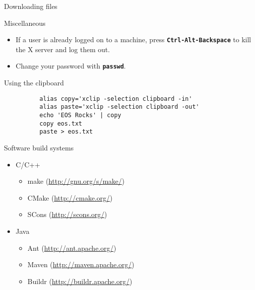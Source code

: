 \documentclass[8pt]{beamer}
\newcommand{\command}[1]{\textbf{\texttt{#1}}}
\begin{document}
\begin{frame}[fragile]{}
\begin{columns}
\begin{column}{0.49\textwidth}
\begin{block}{Downloading files}
      \end{block}
      \vfill
      \begin{block}{Miscellaneous}
        \begin{itemize}
        \item If a user is already logged on to a machine, press \command{Ctrl-Alt-Backspace} to kill the X server and log them out.
        \item Change your password with \command{passwd}.
        \end{itemize}
      \end{block}
      \vfill
      \begin{block}{Using the clipboard}
        \begin{verbatim}
          alias copy='xclip -selection clipboard -in'
          alias paste='xclip -selection clipboard -out'
          echo 'EOS Rocks' | copy
          copy eos.txt
          paste > eos.txt
        \end{verbatim}
      \end{block}
      \vfill
      \begin{block}{Software build systems}
        \begin{itemize}
        \item C/C++
          \begin{itemize}
          \item make (\url{http://gnu.org/s/make/})
          \item CMake (\url{http://cmake.org/})
          \item SCons (\url{http://scons.org/})
          \end{itemize}
        \item Java
          \begin{itemize}
          \item Ant (\url{http://ant.apache.org/})
          \item Maven (\url{http://maven.apache.org/})
          \item Buildr (\url{http://buildr.apache.org/})
          \end{itemize}
        \end{itemize}
      \end{block}
    \end{column}
  \end{columns}
\end{frame}

\end{document}
